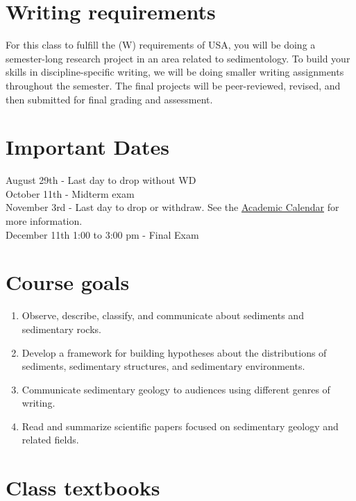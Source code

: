 \documentclass[11pt,]{article}
\begin{document}
\hypertarget{writing-requirements}{%
\section{Writing requirements}\label{writing-requirements}}

For this class to fulfill the (W) requirements of USA, you will be doing
a semester-long research project in an area related to sedimentology. To
build your skills in discipline-specific writing, we will be doing
smaller writing assignments throughout the semester. The final projects
will be peer-reviewed, revised, and then submitted for final grading and
assessment.

\hypertarget{important-dates}{%
\section{Important Dates}\label{important-dates}}

August 29th - Last day to drop without WD\\
October 11th - Midterm exam\\
November 3rd - Last day to drop or withdraw. See the
\href{https://www.southalabama.edu/academiccalendar/}{Academic Calendar}
for more information.\\
December 11th 1:00 to 3:00 pm - Final Exam

\newpage

\hypertarget{course-goals}{%
\section{Course goals}\label{course-goals}}

\begin{enumerate}
\def\labelenumi{\arabic{enumi}.}
\item
  Observe, describe, classify, and communicate about sediments and
  sedimentary rocks.
\item
  Develop a framework for building hypotheses about the distributions of
  sediments, sedimentary structures, and sedimentary environments.
\item
  Communicate sedimentary geology to audiences using different genres of
  writing.
\item
  Read and summarize scientific papers focused on sedimentary geology
  and related fields.
\end{enumerate}

\hypertarget{class-textbooks}{%
\section{Class textbooks}\label{class-textbooks}}
\end{document}
